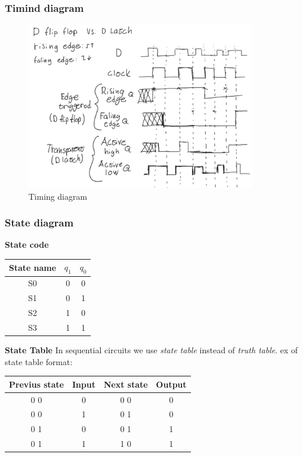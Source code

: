 \documentclass{article}
\begin{document}
\subsubsection{Timind diagram}
\begin{figure}[h]
    \vspace{10mm}
    \centering
    \includegraphics[width=10cm]{image/timing-diagram.pdf}
    \caption{Timing diagram}
\end{figure}


\subsubsection{State diagram}
\textbf{State code}
\begin{center}
\begin{tabular}{ | c | c c | }
    \hline
 State name & $q_1$ & $q_0$  \\ 
    \hline
 S0 & 0 & 0 \\
    \hline
 S1 & 0 & 1 \\
    \hline
 S2 & 1 & 0 \\
    \hline
 S3 & 1 & 1 \\
    \hline
\end{tabular}
\end{center}


\textbf{State Table}
In sequential circuits we use \textit{state table} instead of \textit{truth table}.
ex of state table format:
\begin{center}
\begin{tabular}{ | c | c | c | c | }
    \hline
 Previus state & Input & Next state & Output \\ 
    \hline
 0 0 & 0 & 0 0 & 0 \\ 
    \hline
 0 0 & 1 & 0 1 & 0 \\ 
    \hline
 0 1 & 0 & 0 1 & 1 \\ 
    \hline
 0 1 & 1 & 1 0 & 1 \\ 
    \hline
\end{tabular}
\end{center}
\end{document}
